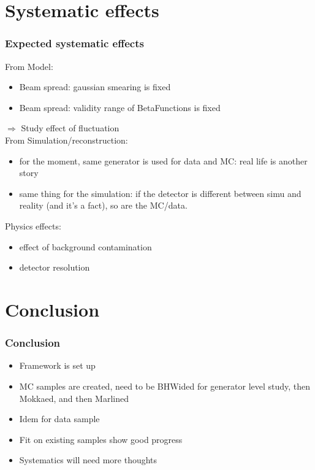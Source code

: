 \documentclass[handout]{beamer}
\begin{document}
\section{Systematic effects}
\begin{frame}
\frametitle{Expected systematic effects}
From Model:
\begin{itemize}
  \item Beam spread: gaussian smearing is fixed
  \item Beam spread: validity range of BetaFunctions is fixed
\end{itemize}
  $\Rightarrow$ Study effect of fluctuation\\
\pause
From Simulation/reconstruction:
\begin{itemize}
  \item for the moment, same generator is used for data and MC: real life is
  another story
  \item same thing for the simulation: if the detector is different between
  simu and reality (and it's a fact), so are the MC/data. 
\end{itemize}
\pause
Physics effects:
\begin{itemize}
  \item effect of background contamination 
  \item detector resolution 
\end{itemize}
\end{frame}
\section{Conclusion}
\begin{frame}
\frametitle{Conclusion}
\begin{itemize}
  \item Framework is set up
  \item MC samples are created, need to be BHWided for generator level study,
  then Mokkaed, and then Marlined
  \item Idem for data sample
  \item Fit on existing samples show good progress
  \item Systematics will need more thoughts
\end{itemize}

\end{frame}
\end{document}
